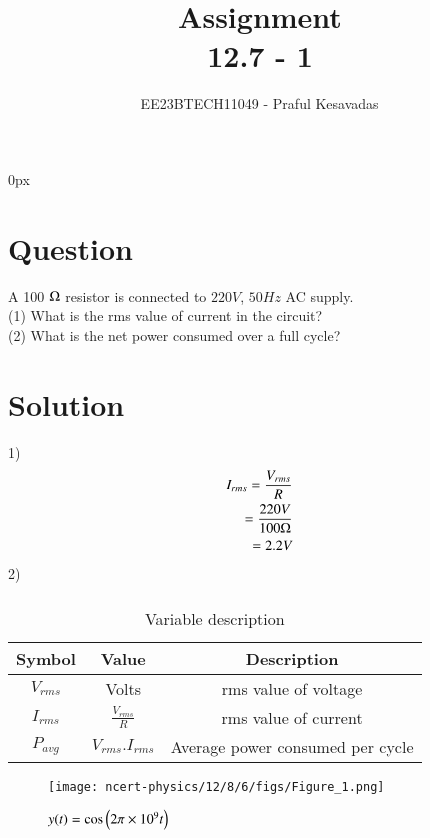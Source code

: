 \documentclass[journal,12pt,twocolumn]{IEEEtran}
\theoremstyle{remark}
\begin{document}
\parindent 0px


\title{Assignment\\[1ex]12.7 - 1}
\author{EE23BTECH11049 - Praful Kesavadas$^{}$%
}
\maketitle
\newpage
\bigskip

\renewcommand{\thefigure}{\theenumi}
\renewcommand{\thetable}{\theenumi}
\section*{Question}
A 100 $\ohm$ resistor is connected to $220 V$, $50 Hz$ AC supply.\\
(1) What is the rms value of current in the circuit?\\
(2) What is the net power consumed over a full cycle?

\section*{Solution}
1)
\begin{align*}
I_{rms} = \frac{V_{rms}}{R}\\
  = \frac{220 V}{100 \ohm}\\
= 2.2 V
\end{align*}
2)
\begin{align*}

\end{align*}
\begin{table}[h]
    \centering
    \begin{tabular}{|c|c|c|}
    \hline
   Symbol&Value&Description\\ \hline
   $V_{rms}$&Volts&rms value of voltage\\ \hline
   $I_{rms}$&$\frac{V_{rms}}{R}$&rms value of current\\ \hline
   $P_{avg}$&$V_{rms} .I_{rms}$&Average power consumed per cycle\\ \hline
   

    \end{tabular}
    \caption{Variable description}
    \label{tab:12.8.6.1}
\end{table}

\begin{figure}[h]
    \centering
    \texttt{[image: ncert-physics/12/8/6/figs/Figure\_1.png]}
    \caption{$y(t)=\cos\left(2{\pi}\times 10^9t\right)$}
    \label{fig:12.8.6.2}
\end{figure}
\end{document}
